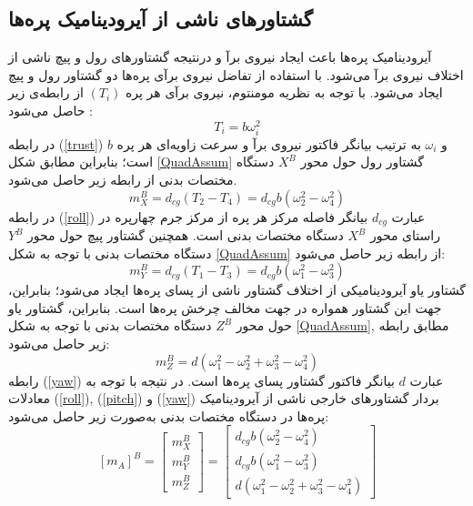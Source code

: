 \documentclass{CCI2020}
\begin{document}
\subsection{گشتاورهای ناشی از آيرودينامیک پره‌ها}
آیرودینامیک پره‌ها باعث ایجاد نیروی برآ و درنتیجه گشتاورهای رول و پیچ ناشی از اختلاف نیروی 
برآ می‌شود. با استفاده از تفاضل نیروی برآی پره‌ها دو گشتاور رول و پیچ ایجاد می‌شود. با توجه به نظریه مومنتوم، نیروی برآی هر پره 
$(T_i)$
از رابطه‌ی زیر حاصل می‌شود
\cite{Sharifi}:
\begin{equation}\label{trust}
	T_i = b\omega_i^2
\end{equation}
در رابطه
(\ref{trust})
$b$
و 
$\omega_i$
به ترتیب بیانگر فاکتور نیروی برآ و سرعت زاویه‌ای هر پره است؛ بنابراین مطابق شکل 
\ref{QuadAssum}
گشتاور رول حول محور
$X^B$
دستگاه مختصات بدنی از رابطه زیر حاصل می‌شود.
\begin{equation}\label{roll}
	m_X^B = d_{cg}(T_2-T_4) = d_{cg}b(\omega_2^2-\omega_4^2)
\end{equation}
در رابطه 
(\ref{roll})
عبارت 
$d_{cg}$
بیانگر فاصله مرکز هر پره از مرکز جرم چهارپره در راستای محور
$X^B$
دستگاه مختصات بدنی است. همچنین گشتاور پیچ حول محور 
$Y^B$
دستگاه مختصات بدنی با توجه به شكل
\ref{QuadAssum}
از رابطه زیر حاصل می‌شود:
\begin{equation}\label{pitch}
	m_Y^B = d_{cg}(T_1-T_3) = d_{cg}b(\omega_1^2-\omega_3^2)
\end{equation}
گشتاور یاو آیرودینامیكی از اختلاف گشتاور ناشی از پسای پره‌ها ایجاد می‌شود؛ بنابراین، جهت این 
گشتاور همواره در جهت مخالف چرخش پره‌ها است. بنابراین، گشتاور یاو حول محور
$Z^B$
دستگاه مختصات بدنی با توجه به شكل
\ref{QuadAssum},
مطابق رابطه زیر حاصل می‌شود:
\begin{equation}\label{yaw}
	m_Z^B = d(\omega_1^2-\omega_2^2+\omega_3^2-\omega_4^2)
\end{equation}
رابطه 
(\ref{yaw})
عبارت 
$d$
بیانگر فاکتور گشتاور پسای پره‌ها است. در نتیجه با توجه به معادلات
(\ref{roll}),
(\ref{pitch})
و
(\ref{yaw})
بردار گشتاورهای خارجی ناشی از آیرودینامیک پره‌ها در دستگاه مختصات بدنی به‌صورت زیر حاصل می‌شود:
\begin{equation}\label{finaltorque}
	\left[m_A\right]^B = \begin{bmatrix}
		m_X^B\\m_Y^B\\m_Z^B
	\end{bmatrix}
	=  \begin{bmatrix}
		d_{cg}b(\omega_2^2-\omega_4^2)\\
		d_{cg}b(\omega_1^2-\omega_3^2)\\
		d(\omega_1^2-\omega_2^2+\omega_3^2-\omega_4^2)
	\end{bmatrix}
\end{equation}
\end{document}
